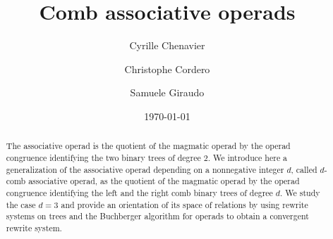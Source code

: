 \documentclass[10pt,reqno]{amsart}
\title{Comb associative operads}
\date{\today}
\author{Cyrille Chenavier \and Christophe Cordero \and Samuele Giraudo}
\numberwithin{equation}{subsection}
\begin{document}
\begin{abstract}
    The associative operad is the quotient of the magmatic operad by
    the operad congruence identifying the two binary trees of degree
    $2$. We introduce here a generalization of the associative operad
    depending on a nonnegative integer $d$, called $d$-comb associative
    operad, as the quotient of the magmatic operad by the operad
    congruence identifying the left and the right comb binary trees of
    degree $d$. We study the case $d = 3$ and provide an orientation
    of its space of relations by using rewrite systems on trees and
    the Buchberger algorithm for operads to obtain a convergent
    rewrite system.
\end{abstract}

\maketitle

\tableofcontents

\end{document}
